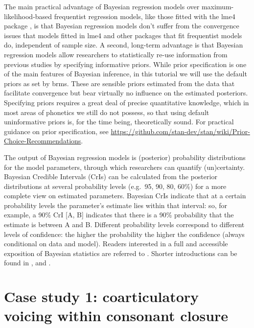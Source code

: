 \documentclass[
  authoryear,
  preprint,
  3p]{elsarticle}
\begin{document}
The main practical advantage of Bayesian regression models over
maximum-likelihood-based frequentist regression models, like those
fitted with the lme4 package \citep{bates2015}, is that Bayesian
regression models don't suffer from the convergence issues that models
fitted in lme4 \citep{bates2015} and other packages
\citep{cribarineto2010} that fit frequentist models do, independent of
sample size. A second, long-term advantage is that Bayesian regression
models allow researchers to statistically re-use information from
previous studies by specifying informative priors. While prior
specification is one of the main features of Bayesian inference, in this
tutorial we will use the default priors as set by brms. These are
sensible priors estimated from the data that facilitate convergence but
bear virtually no influence on the estimated posteriors. Specifying
priors requires a great deal of precise quantitative knowledge, which in
most areas of phonetics we still do not possess, so that using default
uninformative priors is, for the time being, theoretically sound. For
practical guidance on prior specification, see
\url{https://github.com/stan-dev/stan/wiki/Prior-Choice-Recommendations}.

The output of Bayesian regression models is (posterior) probability
distributions for the model parameters, through which researchers can
quantify (un)certainty. Bayesian Credible Intervals (CrIs) can be
calculated from the posterior distributions at several probability
levels (e.g.~95, 90, 80, 60\%) for a more complete view on estimated
parameters. Bayesian CrIs indicate that at a certain probability levels
the parameter's estimate lies within that interval: so, for example, a
90\% CrI {[}A, B{]} indicates that there is a 90\% probability that the
estimate is between A and B. Different probability levels correspond to
different levels of confidence: the higher the probability the higher
the confidence (always conditional on data and model). Readers
interested in a full and accessible exposition of Bayesian statistics
are referred to \citet{mcelreath2019}. Shorter introductions can be
found in \citet{etz2018}, \citet{vasishth2018} and
\citet{nalborczyk2019}.

\section{Case study 1: coarticulatory voicing within consonant
closure}\label{sec-case-1}
\end{document}
